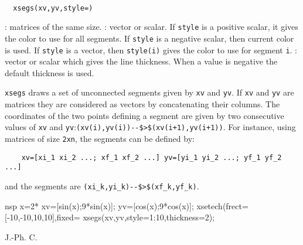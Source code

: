 \begin{mandesc}
  \\
\end{mandesc}
\begin{calling_sequence}
\begin{verbatim}
  xsegs(xv,yv,style=)
\end{verbatim}
\end{calling_sequence}

\begin{parameters}
  \begin{varlist}
    : matrices of the same size.
    : vector or scalar. If \verb!style! is a positive scalar,
    it gives the color to use for all segments. If \verb!style! is
    a negative scalar, then current color is used. If \verb!style!
    is a vector, then \verb!style(i)! gives the color to use for
    segment \verb!i!.
    : vector or scalar which gives the line thickness. 
    When a value is negative the default thickness is used.
    \end{varlist}
\end{parameters}

\begin{mandescription}
  \verb!xsegs! draws a set of unconnected segments given by \verb!xv! and
  \verb!yv!. If \verb!xv! and \verb!yv! are matrices they are considered as
  vectors by concatenating their columns. The coordinates of the two points
  defining a segment are given by two consecutive values of \verb!xv! and
  \verb!yv!:\verb!(xv(i),yv(i))--$>$(xv(i+1),yv(i+1))!. For instance, using
  matrices of size \verb!2xn!, the segments can be defined by:
  \begin{Verbatim}
    xv=[xi_1 xi_2 ...; xf_1 xf_2 ...] yv=[yi_1 yi_2 ...; yf_1 yf_2  ...]
  \end{Verbatim}
  and the segments are \verb!(xi_k,yi_k)--$>$(xf_k,yf_k)!.
\end{mandescription}
\begin{examples}
  \begin{mintednsp}{nsp}
    x=2*%
    xv=[sin(x);9*sin(x)];
    yv=[cos(x);9*cos(x)];
    xsetech(frect=[-10,-10,10,10],fixed=%
    xsegs(xv,yv,style=1:10,thickness=2);
  \end{mintednsp}
\end{examples}
\begin{authors}
  J.-Ph. C.
\end{authors}

